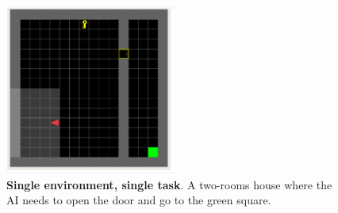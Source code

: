 \documentclass[10pt]{article} %
\begin{document}
    \begin{figure}
      \centering
      \includegraphics[width=0.5\textwidth]{figures/same_1.png}
      \caption{\textbf{Single environment, single task}. A two-rooms house where the AI needs to open the door and go to the green square.} 
      \end{figure}
\end{document}
